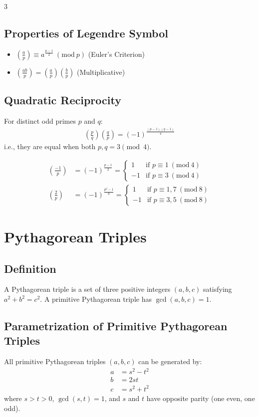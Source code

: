 \documentclass[8,a4paper]{article}
\newcommand{\Mod}[1]{\ (\mathrm{mod}\ #1)}
\begin{document}
\begin{multicols}{3}
	\subsection{Properties of Legendre Symbol}
	\begin{itemize}[leftmargin=*]
		\item $\left(\frac{a}{p}\right) \equiv a^{\frac{p-1}{2}} \Mod{p}$ (Euler's Criterion)
		\item $\left(\frac{ab}{p}\right) = \left(\frac{a}{p}\right) \left(\frac{b}{p}\right)$ (Multiplicative)
	\end{itemize}

	\subsection{Quadratic Reciprocity}
	For distinct odd primes $p$ and $q$:
	\begin{align*}
		\left(\frac{p}{q}\right) \left(\frac{q}{p}\right) = (-1)^{\frac{(p-1)(q-1)}{4}}
	\end{align*}
	i.e., they are equal when both $p, q = 3 \pmod{4}$.

	\begin{align*}
		\left(\frac{-1}{p}\right) & = (-1)^{\frac{p-1}{2}} =
		\begin{cases}
			1  & \text{if } p \equiv 1 \Mod{4} \\
			-1 & \text{if } p \equiv 3 \Mod{4}
		\end{cases}                     \\
		\left(\frac{2}{p}\right)  & = (-1)^{\frac{p^2-1}{8}} =
		\begin{cases}
			1  & \text{if } p \equiv 1, 7 \Mod{8} \\
			-1 & \text{if } p \equiv 3, 5 \Mod{8}
		\end{cases}
	\end{align*}

	\section{Pythagorean Triples}

	\subsection{Definition}
	A Pythagorean triple is a set of three positive integers $(a,b,c)$ satisfying $a^2 + b^2 = c^2$.
	A primitive Pythagorean triple has $\gcd(a,b,c) = 1$.


	\subsection{Parametrization of Primitive Pythagorean Triples}
	All primitive Pythagorean triples $(a,b,c)$ can be generated by:
	\begin{align*}
		a & = s^2 - t^2 \\
		b & = 2st       \\
		c & = s^2 + t^2
	\end{align*}
	where $s > t > 0$, $\gcd(s,t) = 1$, and $s$ and $t$ have opposite parity (one even, one odd).


\end{multicols}
\end{document}
